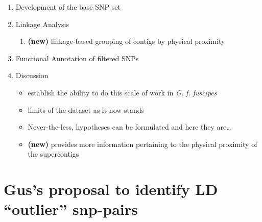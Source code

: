 \documentclass[letterpaper]{scrartcl}
\begin{document}
\begin{enumerate}
\def\labelenumi{\arabic{enumi}.}
\itemsep1pt\parskip0pt
\item
  Development of the base SNP set
\item
  Linkage Analysis

  \begin{enumerate}
  \def\labelenumii{\alph{enumii}.}
  \itemsep1pt\parskip0pt
  \item
    \textbf{(new)} linkage-based grouping of contigs by physical
    proximity
  \end{enumerate}
\item
  Functional Annotation of filtered SNPs
\item
  Discussion

  \begin{itemize}
  \itemsep1pt\parskip0pt
  \item
    establish the ability to do this scale of work in \emph{G. f.
    fuscipes}
  \item
    limits of the dataset as it now stands
  \item
    Never-the-less, hypotheses can be formulated and here they
    are\ldots{}
  \item
    \textbf{(new)} provides more information pertaining to the physical
    proximity of the supercontigs
  \end{itemize}
\end{enumerate}

\section{Gus's proposal to identify LD ``outlier''
snp-pairs}\label{guss-proposal-to-identify-ld-outlier-snp-pairs}
\end{document}
